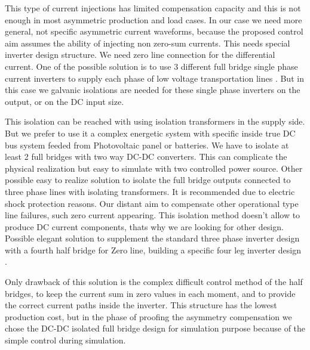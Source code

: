     This type of current injections has limited compensation capacity and this is not enough in most asymmetric production and load cases. In our case we need more general, not specific asymmetric current waveforms, because the proposed control aim assumes the ability of injecting non zero-sum currents. This needs special inverter design structure. We need zero line connection for the differential current. One of the possible solution is to use 3 different full bridge single phase current inverters to supply each phase of low voltage transportation lines \cite{Patnaik2013topologies}. But in this case we galvanic isolations are needed for these single phase inverters on the output, or on the DC input size.

    This isolation can be reached  with using isolation transformers in the supply side. But we prefer to use it a complex energetic system with specific inside true DC bus system feeded from Photovoltaic panel or batteries. We have to isolate  at least 2 full bridges with two way DC-DC converters. This can complicate the physical realization but easy to simulate with two controlled power source. Other possible easy to realize solution to isolate the full bridge outputs  connected to three phase lines with isolating transformers. It is recommended due to electric shock protection reasons. Our distant aim to compensate other operational type line failures, such zero current appearing. This isolation method doesn't allow to produce DC current components, thats why we are looking for other design. Possible elegant solution to supplement the standard three phase inverter design with a fourth half bridge for Zero line, building a specific four leg inverter design \cite{Ninad2014control}.

    Only drawback of this solution is the complex difficult control method of the half bridges, to keep the current sum in zero values in each moment, and to provide the correct current paths inside the inverter. This structure has the lowest production cost, but in the phase of proofing the asymmetry compensation we chose the DC-DC isolated  full bridge design for simulation purpose because of the simple control during simulation.

